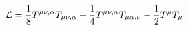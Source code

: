 \begin{equation}
{\cal L} = \frac{1}{8} T^{\mu\nu,\alpha} T_{\mu\nu,\alpha} +
\frac{1}{4} T^{\mu\nu,\alpha} T_{\mu\alpha,\nu} - \frac{1}{2}
T^\mu T_\mu \label{eq1}
\end{equation}

